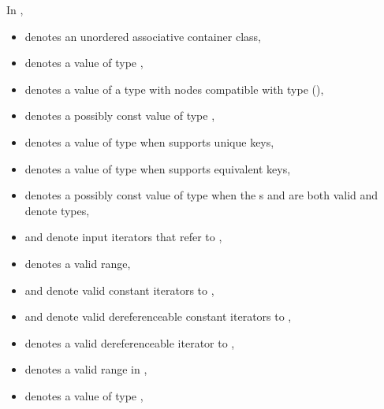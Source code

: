 \documentclass{wg21}
\begin{document}
\pnum
{}%
%
%
%
%
%
In ,
\begin{itemize}
    \item
     denotes an unordered associative container class,
    \item
     denotes a value of type ,
    \item
     denotes a value of a type with nodes compatible
    with type  (),
    \item
     denotes a possibly const value of type ,
    \item
     denotes a value of type 
    when  supports unique keys,
    \item
     denotes a value of type 
    when  supports equivalent keys,
    \item
     denotes a possibly const value of type 
    when the s
     and
    are both valid and denote types,
    \item
     and  denote input iterators
    that refer to ,
    \item
    \tcode{[i, j)} denotes a valid range,
    \item
     and  denote valid constant iterators to ,
    \item
     and  denote
    valid dereferenceable constant iterators to ,
    \item
     denotes a valid dereferenceable iterator to ,
    \item
    \tcode{[q1, q2)} denotes a valid range in ,
    \item
     denotes a value of type ,

\end{itemize}
\end{document}
